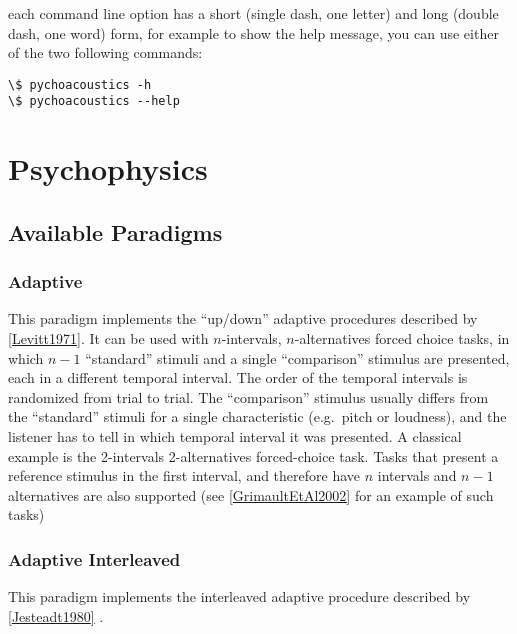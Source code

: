 \documentclass[a4paper,12pt,english]{sphinxmanual}
\begin{document}
each command line option has a short (single dash, one letter) and long
(double dash, one word) form, for example to show the help message, you
can use either of the two following commands:

\begin{Verbatim}[commandchars=\\\{\}]
\$ pychoacoustics -h
\$ pychoacoustics --help
\end{Verbatim}


\chapter{Psychophysics}
\label{psychophysics:psychophysics}\label{psychophysics::doc}\label{psychophysics:sec-psychophysics}

\section{Available Paradigms}
\label{psychophysics:available-paradigms}\label{psychophysics:sec-paradigms}

\subsection{Adaptive}
\label{psychophysics:adaptive}
This paradigm implements the “up/down” adaptive procedures described by
{\hyperref[references:levitt1971]{{[}Levitt1971{]}}}. It can be used with $n$-intervals, $n$-alternatives forced
choice tasks, in which $n-1$ “standard” stimuli and a single
“comparison” stimulus are presented, each in a different temporal
interval. The order of the temporal intervals is randomized from trial
to trial. The “comparison” stimulus usually differs from the “standard”
stimuli for a single characteristic (e.g. pitch or loudness), and the
listener has to tell in which temporal interval it was presented. A
classical example is the 2-intervals 2-alternatives forced-choice task.
Tasks that present a reference stimulus in the first interval, and
therefore have $n$ intervals and $n-1$ alternatives are also
supported (see {\hyperref[references:grimaultetal2002]{{[}GrimaultEtAl2002{]}}} for an example of such tasks)


\subsection{Adaptive Interleaved}
\label{psychophysics:adaptive-interleaved}
This paradigm implements the interleaved adaptive procedure described by {\hyperref[references:jesteadt1980]{{[}Jesteadt1980{]}}} .
\end{document}

